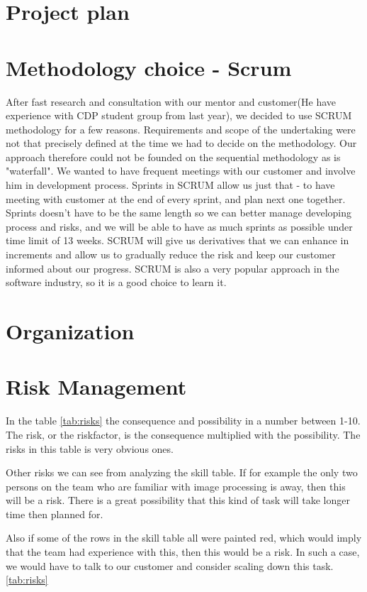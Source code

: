 \section{Project plan}
\section{Methodology choice - Scrum}
After fast research and consultation with our mentor and customer(He have experience with CDP student group from last year), we decided to use SCRUM methodology for a few reasons. Requirements and scope of the undertaking were not that precisely defined at the time we had to decide on the methodology. Our approach therefore could not be founded on the sequential methodology as is "waterfall". We wanted to have frequent meetings with our customer and involve him in development process. Sprints in SCRUM allow us just that - 
to have meeting with customer at the end of every sprint, and plan next one together. Sprints doesn't have to be the same length so we can better manage developing process and risks, and we will be able to have as much sprints as possible under time limit of 13 weeks. SCRUM will give us derivatives that we can enhance in increments and allow us to gradually reduce the risk and keep our customer informed about our progress. SCRUM is also a very popular approach in the software industry, so it is a good choice to learn it.
\section{Organization}
\section{Risk Management}
In the table \ref{tab:risks} the consequence and possibility in a number between 1-10. The risk, or the riskfactor, is the consequence multiplied with the possibility. The risks in this table is very obvious ones. 

Other risks we can see from analyzing the skill table. If for example the only two persons on the team who are familiar with image processing is away, then this will be a risk. There is a great possibility that this kind of task will take longer time then planned for. 

Also if some of the rows in the skill table all were painted red, which would imply that the team had experience with this, then this would be a risk. In such a case, we would have to talk to our customer and consider scaling down this task. 
\ref{tab:risks}

